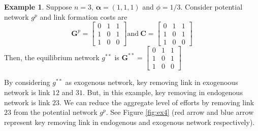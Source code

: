 \documentclass[12pt]{article}
\theoremstyle{definition}
\newtheorem{example}{Example}
\begin{document}
\begin{example}
Suppose $n=3$, $\bm{\alpha} = (1,1,1)$ and $\phi = 1/3$.
Consider potential network $g^p$ and link formation costs are
\[
\bm{G}^p = \left[
            \begin{array}{ccc}
                0 & 1 & 1 \\
                1 & 0 & 1 \\
                1 & 0 & 0
            \end{array} \right]
\text{and} \ 
\bm{C} = \left[
            \begin{array}{ccc}
                0 & 1 & 1 \\
                1 & 0 & 1 \\
                1 & 0 & 0
            \end{array} \right]\]
Then, the equilibrium network $g^{**}$ is
            $\bm{G}^{**} = \left[
                \begin{array}{ccc}
                    0 & 1 & 1 \\
                    1 & 0 & 1 \\
                    1 & 0 & 0
                \end{array} \right]$

By considering $g^{**}$ as exogenous network, key removing link in exogenoous network is link $12$ and $31$.
But, in this example, key removing in endogenous network is link $23$.
We can reduce the aggregate level of efforts by removing link $23$ from the potential network $g^p$.
See Figure \ref{fig:ex4} (red arrow and blue arrow represent key removing link in endogenous and exogenous network respectively).
\end{example}
\end{document}
